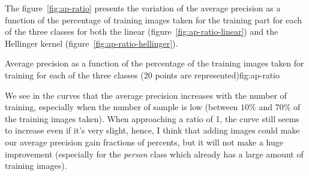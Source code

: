 \documentclass{article}
\begin{document}

The figure~\ref{fig:ap-ratio} presents the variation of the average
precision as a function of the percentage of training images taken for
the training part for each of the three classes for both the linear
(figure~\ref{fig:ap-ratio-linear}) and the Hellinger kernel
(figure~\ref{fig:ap-ratio-hellinger}).

\doublefig
{}
{} {Average precision as a function
  of the percentage of the training images taken for training for each
  of the three classes (20 points are represented)}{fig:ap-ratio}


We see in the curves that the average precision increases with the
number of training, especially when the number of sample is low
(between $10\%$ and $70\%$ of the training images taken). When
approaching a ratio of 1, the curve still seems to increase even if
it's very slight, hence, I think that adding images could make our
average precision gain fractions of percents, but it will not make a
huge improvement (especially for the \emph{person} class which already
has a large amount of training images).


\end{document}
